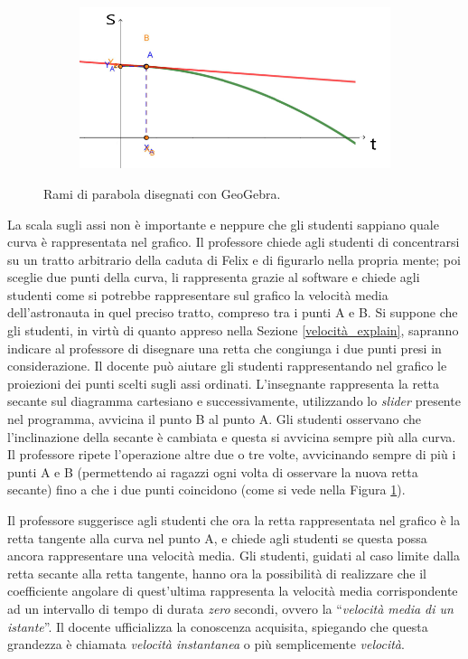 \documentclass{report} \usepackage[T1]{fontenc} \usepackage[italian]{babel}
\begin{document}
\begin{figure}[H]
\begin{subfigure}[b]{0.49\textwidth}
  \end{subfigure}
  \begin{subfigure}[b]{0.49\textwidth}
  \includegraphics[width=\textwidth]{tg4}
  \end{subfigure}
  \caption{
           Rami di parabola  disegnati con GeoGebra.
          }
  \label{fig:geogebra}
\end{figure}
La scala sugli assi non è importante e neppure che gli studenti sappiano quale
curva è rappresentata nel grafico.
Il professore chiede agli studenti di concentrarsi su un tratto arbitrario della
caduta di Felix e di figurarlo nella propria mente; poi sceglie due punti
della curva, li rappresenta grazie al software e chiede agli studenti
come si potrebbe rappresentare sul grafico la velocità media dell'astronauta
in quel preciso tratto, compreso tra i punti A e B.
Si suppone che gli studenti, in virtù di quanto appreso
nella Sezione \ref{velocità_explain}, sapranno indicare al professore di
disegnare una retta che congiunga i due punti presi in considerazione.
Il docente può aiutare gli studenti rappresentando nel grafico le proiezioni
dei punti scelti sugli assi ordinati.
L'insegnante rappresenta la retta secante sul diagramma cartesiano e
successivamente, utilizzando lo \emph{slider} presente nel programma,
avvicina il punto B al punto A. Gli studenti osservano che l'inclinazione
della secante è cambiata e questa si avvicina sempre più alla curva.
Il professore ripete l'operazione altre due o
tre volte, avvicinando sempre di più i punti A e B (permettendo ai ragazzi
ogni volta di osservare la nuova retta secante) fino a che i due punti
coincidono (come si vede nella Figura \ref{fig:geogebra}).

Il professore suggerisce agli studenti che ora la retta rappresentata nel grafico
è la retta tangente alla curva nel punto A, e chiede agli studenti se questa possa
ancora rappresentare una velocità media. Gli studenti, guidati al caso limite dalla retta
secante alla retta tangente, hanno ora la possibilità di realizzare che il coefficiente
angolare di quest'ultima rappresenta la velocità media corrispondente ad un intervallo
di tempo di durata \emph{zero} secondi, ovvero la ``\emph{velocità media di un istante}''.
Il docente ufficializza la conoscenza acquisita, spiegando che questa grandezza è
chiamata \emph{velocità instantanea} o più semplicemente \emph{velocità}.
\end{document}
